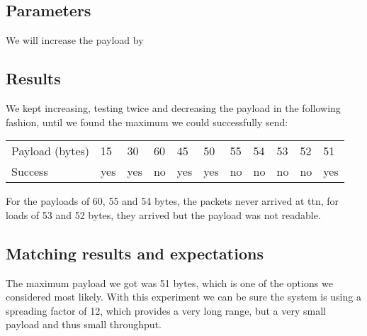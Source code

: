 	\subsection{Parameters}
		We will increase the payload by 
	\subsection{Results}
		We kept increasing, testing twice and decreasing the payload in the following fashion, until we found the maximum we could successfully send:

		\begin{table}[h]
			\begin{tabular}{@{}lllllllllll@{}}
				Payload (bytes) & 15  & 30  & 60 & 45  & 50  & 55 & 54 & 53 & 52 & 51  \\
				Success & yes & yes & no & yes & yes & no & no & no & no & yes
			\end{tabular}
		\end{table}

		For the payloads of 60, 55 and 54 bytes, the packets never arrived at ttn, for loads of 53 and 52 bytes, they arrived but the payload was not readable.

	\subsection{Matching results and expectations}
		The maximum payload we got was 51 bytes, which is one of the options we considered most likely. With this experiment we can be sure the system is using a spreading factor of 12, which provides a very long range, but a very small payload and thus small throughput.

